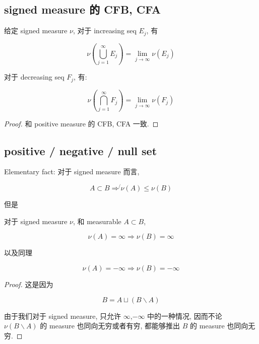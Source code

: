 \subsection{signed measure 的 CFB, CFA}\label{signed-measure-ux7684-cfb-cfa}

\begin{proposition}{}

给定 signed measure \(\nu\), 对于 increasing seq \(E_{j}\), 有

\[\nu(\bigcup\limits_{j = 1}^{\infty}E_{j}) = \lim\limits_{j\rightarrow\infty}\nu(E_{j})\]

对于 decreasing seq \(F_{j}\), 有:

\[\nu(\bigcap\limits_{j = 1}^{\infty}F_{j}) = \lim\limits_{j\rightarrow\infty}\nu(F_{j})\]

\end{proposition}

\begin{proof}

和 positive measure 的 CFB, CFA 一致.

\end{proof}

\subsection{positive / negative / null set}\label{positive-negative-null-set}

Elementary fact: 对于 signed measure 而言,

\[A \subset B\operatorname{\Rightarrow\not{}}\nu(A) \leq \nu(B)\]

但是

\begin{lemma}

对于 signed measure \(\nu\), 和 measurable \(A \subset B\),

\[\nu(A) = \infty\Longrightarrow\nu(B) = \infty\]

以及同理

\[\nu(A) = - \infty\Longrightarrow\nu(B) = - \infty\]

\end{lemma}

\begin{proof}

这是因为

\[B = A \sqcup (B\backslash A)\]

由于我们对于 signed measure, 只允许 \(\infty\),\(- \infty\) 中的一种情况, 因而不论 \(\nu(B\backslash A)\) 的 measure 也同向无穷或者有穷, 都能够推出 \(B\) 的 measure 也同向无穷.

\end{proof}

